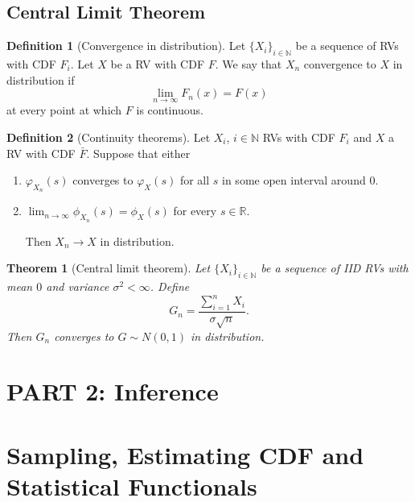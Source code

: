 \documentclass[
  openany]{book}
\newtheorem{theorem}{Theorem}[chapter]
\theoremstyle{definition}
\newtheorem{definition}{Definition}[chapter]
\theoremstyle{definition}
\theoremstyle{definition}
\theoremstyle{definition}
\theoremstyle{remark}
\begin{document}
\section{Central Limit Theorem}\label{central-limit-theorem}

\begin{definition}[Convergence in distribution]
Let \(\{X_i\}_{i \in \mathbb{N}}\) be a sequence of RVs with CDF \(F_i\).
Let \(X\) be a RV with CDF \(F\).
We say that \(X_n\) convergence to \(X\) in distribution if
\[ \lim_{n\to \infty} F_n (x) = F(x) \] at every point at which \(F\) is continuous.
\end{definition}

\begin{definition}[Continuity theorems]

Let \(X_i\), \(i \in \mathbb{N}\) RVs with CDF \(F_i\) and \(X\) a RV with CDF \(\bar F\).
Suppose that either

\begin{enumerate}
\def\labelenumi{\arabic{enumi}.}
\item
  \(\varphi_{X_n}(s)\) converges to \(\varphi_X(s)\) for all \(s\) in some open interval around \(0\).
\item
  \(\lim_{n\to\infty} \phi_{X_n}(s) = \phi_X(s)\) for every \(s \in \mathbb{R}\).

  Then \(X_n \to X\) in distribution.
\end{enumerate}

\end{definition}

\begin{theorem}[Central limit theorem]
Let \(\{ X_i \}_{i\in \mathbb{N}}\) be a sequence of IID RVs with mean \(0\) and
variance \(\sigma^2 < \infty\).
Define
\[ G_n = \frac{\sum_{i=1}^n X_i}{\sigma \sqrt{n}}. \]
Then \(G_n\) converges to \(G \sim N(0,1)\) in distribution.
\end{theorem}

\chapter*{PART 2: Inference}\label{part-2-inference}


\chapter{Sampling, Estimating CDF and Statistical Functionals}\label{sampling-estimating-cdf-and-statistical-functionals}
\end{document}
